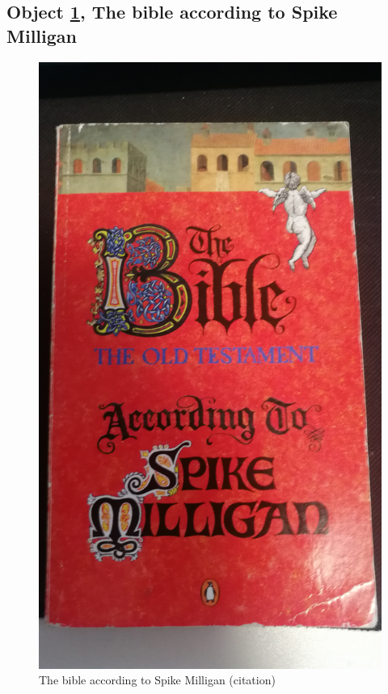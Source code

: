 \documentclass[a4paper,11pt]{article}
\begin{document}
\subsection*{Object \ref{fig:bible}, The bible according to Spike Milligan}

\begin{figure}[H]
 \centering
 \includegraphics[scale=0.07]{bible.jpg}
 \caption{The bible according to Spike Milligan (citation)}
 \label{fig:bible}
\end{figure}
\end{document}
